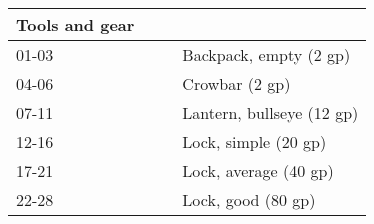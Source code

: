 \begin{longtable}{llll}
{\begin{minipage}[t]{0.896in}
Tools and gear\end{minipage}}\\
\hline
\multicolumn{3}{p{3.276in}|}{\begin{minipage}[t]{3.276in}\raggedright
01-03\end{minipage}} & \multicolumn{1}{|p{0.896in}|}{\begin{minipage}[t]{0.896in}\raggedright
Backpack, empty (2 gp)\end{minipage}}\\
\hline
\multicolumn{3}{p{3.276in}|}{\begin{minipage}[t]{3.276in}\raggedright
04-06\end{minipage}} & \multicolumn{1}{|p{0.896in}|}{\begin{minipage}[t]{0.896in}\raggedright
Crowbar (2 gp)\end{minipage}}\\
\hline
\multicolumn{3}{p{3.276in}|}{\begin{minipage}[t]{3.276in}\raggedright
07-11\end{minipage}} & \multicolumn{1}{|p{0.896in}|}{\begin{minipage}[t]{0.896in}\raggedright
Lantern, bullseye (12 gp)\end{minipage}}\\
\hline
\multicolumn{3}{p{3.276in}|}{\begin{minipage}[t]{3.276in}\raggedright
12-16\end{minipage}} & \multicolumn{1}{|p{0.896in}|}{\begin{minipage}[t]{0.896in}\raggedright
Lock, simple (20 gp)\end{minipage}}\\
\hline
\multicolumn{3}{p{3.276in}|}{\begin{minipage}[t]{3.276in}\raggedright
17-21\end{minipage}} & \multicolumn{1}{|p{0.896in}|}{\begin{minipage}[t]{0.896in}\raggedright
Lock, average (40 gp)\end{minipage}}\\
\hline
\multicolumn{3}{p{3.276in}|}{\begin{minipage}[t]{3.276in}\raggedright
22-28\end{minipage}} & \multicolumn{1}{|p{0.896in}|}{\begin{minipage}[t]{0.896in}\raggedright
Lock, good (80 gp)\end{minipage}}\\

\end{longtable}
